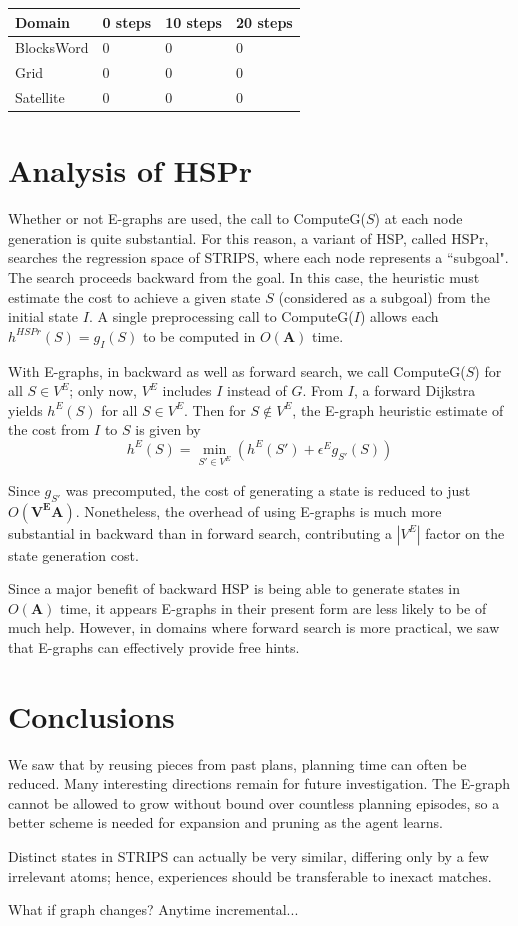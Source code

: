 \documentclass[letterpaper]{article}
\begin{document}
\begin{center}
    \begin{tabular}{| l | l | l | l |}
    \hline
    Domain & 0 steps & 10 steps & 20 steps
    \\ \hline
    BlocksWord & 0 & 0 & 0
    \\ \hline
    Grid & 0 & 0 & 0
    \\ \hline
    Satellite & 0 & 0 & 0
    \\ \hline
    \end{tabular}
\end{center}

\section{Analysis of HSPr}

Whether or not E-graphs are used, the call to ComputeG($S$) at each node generation is quite substantial. For this reason, a variant of HSP, called HSPr, searches the regression space of STRIPS, where each node represents a ``subgoal". The search proceeds backward from the goal. In this case, the heuristic must estimate the cost to achieve a given state $S$ (considered as a subgoal) from the initial state $I$. A single preprocessing call to ComputeG($I$) allows each $h^{HSPr}(S) = g_I(S)$ to be computed in $O(\mathbf{A})$ time.

With E-graphs, in backward as well as forward search, we call ComputeG($S$) for all $S\in V^E$; only now, $V^E$ includes $I$ instead of $G$. From $I$, a forward Dijkstra yields $h^E(S)$ for all $S\in V^E$. Then for $S\notin V^E$, the E-graph heuristic estimate of the cost from $I$ to $S$ is given by
\[h^E(S) = \min_{S'\in V^E}\left(h^E(S') + \epsilon^E g_{S'}(S) \right)\]

Since $g_{S'}$ was precomputed, the cost of generating a state is reduced to just $O(\mathbf{V^EA})$. Nonetheless, the overhead of using E-graphs is much more substantial in backward than in forward search, contributing a $|V^E|$ factor on the state generation cost.

Since a major benefit of backward HSP is being able to generate states in $O(\mathbf{A})$ time, it appears E-graphs in their present form are less likely to be of much help. However, in domains where forward search is more practical, we saw that E-graphs can effectively provide free hints.

\section{Conclusions}

We saw that by reusing pieces from past plans, planning time can often be reduced. Many interesting directions remain for future investigation. The E-graph cannot be allowed to grow without bound over countless planning episodes, so a better scheme is needed for expansion and pruning as the agent learns.

Distinct states in STRIPS can actually be very similar, differing only by a few irrelevant atoms; hence, experiences should be transferable to inexact matches.

What if graph changes? Anytime incremental...



\end{document}
